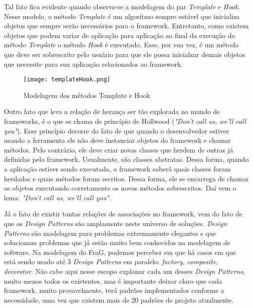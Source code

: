 \documentclass[
    12pt,       %
    openright,      %
    twoside,      %
    a4paper,      %
    english,      %
    french,       %
    spanish,      %
    brazil,       %
    ]{abntex2}
\begin{document}
          Tal fato fica evidente quando observa-se a modelagem do par \textit{Template} e
          \textit{Hook}. Nesse modelo, o método \textit{Template} é um algoritmo sempre
          estável que inicializa objetos que sempre serão necessários para o framework.
          Entretanto, como existem objetos que podem variar de aplicação para aplicação
          ao final da execução do método \textit{Template} o método \textit{Hook} é
          executado. Esse, por sua vez, é um método que deve ser sobrescrito pelo usuário
          para que ele possa inicialzar demais objetos que necessite para sua aplicação
          relacionados ao framework.

          \begin{figure}[htbp]
              \begin{center}
                  \texttt{[image: templateHook.png]}
              \end{center}
              \caption{\label{fig:passaro}Modelagem dos métodos Template e Hook}
          \end{figure}

          Outro fato que leva a relação de herança ser tão explorada no mundo de frameworks,
          é o que se chama de princípio de Hollwood (\textit{"Don't call us, we'll call you"}).
          Esse princípio decorre do fato de que quando o desenvolvedor estiver usando a
          ferramenta ele não deve instanciar objetos do framework e chamar métodos. Pelo
          contrário, ele deve criar novas classes que herdem de outras já definidas pelo
          framework. Usualmente, são classes abstratas. Dessa forma, quando a aplicação
          estiver sendo executada, o framework saberá quais classes foram herdadas e
          quais métodos foram escritos. Dessa forma, ele se encarrega de chamar
          os objetos executando corretamente os novos métodos sobrescritos. Daí
          vem o lema: \textit{"Don't call us, we'll call you"}.

          Já o fato de existir tantas relações de associações no framework, vem
          do fato de que os \textit{Design Patterns} são amplamente neste universo de
          soluções. \textit{Design Patterns} são modelagem para problemas extremamente
          elegantes e que solucionam problemas que já estão muito bem conhecidos na
          modelagem de software. Na modelagem do FraG, podemos perceber em que há
          casos em que está sendo usado até 3 \textit{Design Patterns} em paralelo:
          \textit{factory, composite, decorator}. Não cabe aqui nesse escopo explanar
          cada um desses \textit{Design Patterns}, muito menos todos os existentes,
          mas é importante deixar claro que cada framework, muito provavelmente, terá
          padrões implementados conforme a necessidade, uma vez que existem mais de
          20 padrões de projeto atualmente.
\end{document}
